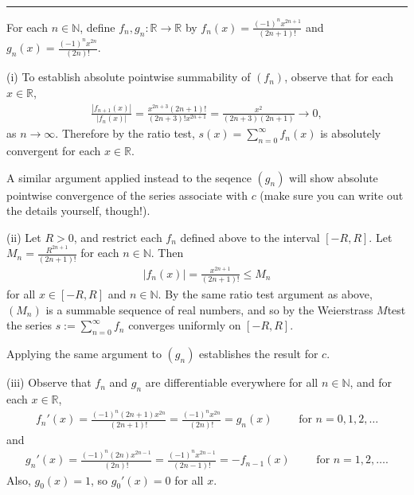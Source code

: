 \documentclass[letterpaper,10pt,english]{jupyterBook}
\begin{document}
\bigskip\hrule\bigskip


\sphinxAtStartPar
{\hyperref[\detokenize{Problems:id61}]{}} For each \(n\in\mathbb{N}\), define \(f_n,g_n:\mathbb{R}\to\mathbb{R}\) by \(f_n(x)=\frac{(-1)^nx^{2n+1}}{(2n+1)!}\) and \(g_n(x)=\frac{(-1)^nx^{2n}}{(2n)!}\).

\sphinxAtStartPar
(i) To establish absolute pointwise summability of \((f_n)\), observe that for each  \(x\in\mathbb{R}\),
\begin{equation*}
\begin{split}
\frac{|f_{n+1}(x)|}{|f_n(x)|} = \frac{x^{2n+3}(2n+1)!}{(2n+3)!x^{2n+1}} = \frac{x^2}{(2n+3)(2n+1)} \rightarrow 0,
\end{split}
\end{equation*}
\sphinxAtStartPar
as \(n\rightarrow\infty\). Therefore by the ratio test, \(s(x) = \sum_{n=0}^\infty f_n(x)\) is absolutely convergent for each \(x\in\mathbb{R}\).

\sphinxAtStartPar
A similar argument applied instead to the seqence \((g_n)\) will show absolute pointwise convergence of the series associate with \(c\) (make sure you can write out the details yourself, though!).

\sphinxAtStartPar
(ii) Let \(R>0\), and restrict each \(f_n\) defined above to the interval \([-R,R]\). Let \(M_n=\frac{R^{2n+1}}{(2n+1)!}\) for each \(n\in\mathbb{N}\). Then
\begin{equation*}
\begin{split}
|f_n(x)| = \frac{x^{2n+1}}{(2n+1)!} \leq M_n
\end{split}
\end{equation*}
\sphinxAtStartPar
for all \(x\in[-R,R]\) and \(n\in\mathbb{N}\). By the same ratio test argument as above, \((M_n)\) is a summable sequence of real numbers, and so by the Weierstrass \(M\)\sphinxhyphen{}test the series \(s:=\sum_{n=0}^\infty f_n\) converges uniformly on \([-R,R]\).

Applying the same argument to \((g_n)\) establishes the result for \(c\).

\sphinxAtStartPar
(iii) Observe that \(f_n\) and \(g_n\) are differentiable everywhere for all \(n\in\mathbb{N}\), and for each \(x\in\mathbb{R}\),
\begin{equation*}
\begin{split}
f_n'(x) = \frac{(-1)^n(2n+1)x^{2n}}{(2n+1)!}=\frac{(-1)^nx^{2n}}{(2n)!}=g_n(x) \hspace{2em} \text{ for } n=0,1,2,\ldots
\end{split}
\end{equation*}
\sphinxAtStartPar
and
\begin{equation*}
\begin{split}
g_n'(x) = \frac{(-1)^n(2n)x^{2n-1}}{(2n)!} = \frac{(-1)^nx^{2n-1}}{(2n-1)!} = -f_{n-1}(x) \hspace{2em} \text{ for } n=1,2,\ldots.
\end{split}
\end{equation*}
\sphinxAtStartPar
Also, \(g_0(x)=1\), so \(g_0'(x)=0\) for all \(x\).
\end{document}
